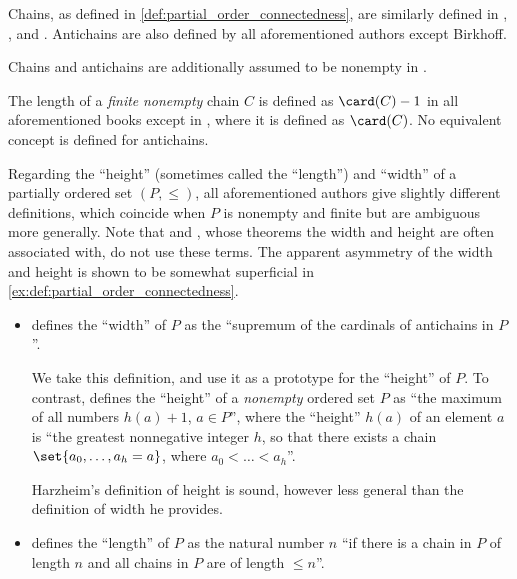 \begin{remark}\label{rem:partial_order_height_and_width}
  Chains, as defined in \cref{def:partial_order_connectedness}, are similarly defined in
  \cite[4]{Grätzer2011LatticeTheory},
  \cite[2]{Birkhoff1967LatticeTheory},
  \cite[def. 1.6.1]{Harzheim2005OrderedSets} and
  \cite[\S 1.3]{DaveyPriestley2002LatticeTheory}. Antichains are also defined by all aforementioned authors except Birkhoff.

  Chains and antichains are additionally assumed to be nonempty in \cite[def. 3.4]{Гуров2013ТеорияРешёток}.

  The length of a \emph{finite} \emph{nonempty} chain \( C \) is defined as \( \card(C) - 1 \) in all aforementioned books except in \cite[def. 1.6.1]{Harzheim2005OrderedSets}, where it is defined as \( \card(C) \). No equivalent concept is defined for antichains.

  Regarding the \enquote{height} (sometimes called the \enquote{length}) and \enquote{width} of a partially ordered set \( (P, \leq) \), all aforementioned authors give slightly different definitions, which coincide when \( P \) is nonempty and finite but are ambiguous more generally. Note that \textcite{Dilworth1950DecompositionTheorem} and \textcite{Mirsky1971DualOfDilworthsTheorem}, whose theorems the width and height are often associated with, do not use these terms. The apparent asymmetry of the width and height is shown to be somewhat superficial in \cref{ex:def:partial_order_connectedness}.

  \begin{itemize}
    \item \Textcite[def. 2.5.1]{Harzheim2005OrderedSets} defines the \enquote{width} of \( P \) as the \enquote{supremum of the cardinals of antichains in \( P \)}.

    We take this definition, and use it as a prototype for the \enquote{height} of \( P \). To contrast, \textcite[def. 2.7.1]{Harzheim2005OrderedSets} defines the \enquote{height} of a \emph{nonempty} ordered set \( P \) as \enquote{the maximum of all numbers \( h(a) + 1 \), \( a \in P \)}, where the \enquote{height} \( h(a) \) of an element \( a \) is \enquote{the greatest nonnegative integer \( h \), so that there exists a chain \( \set{ a_0, \ldots, a_h = a } \), where \( a_0 < \ldots < a_h \)}.

    Harzheim's definition of height is sound, however less general than the definition of width he provides.

    \item \Textcite[4]{Grätzer2011LatticeTheory} defines the \enquote{length} of \( P \) as the natural number \( n \) \enquote{if there is a chain in \( P \) of length \( n \) and all chains in \( P \) are of length \( \leq n \)}.


\end{itemize}
\end{remark}
